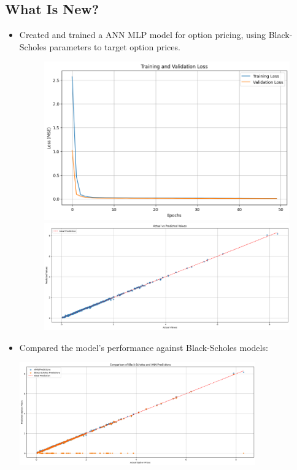 \documentclass[letterpaper,11pt]{article}
\begin{document}
\subsection*{What Is New?}
\begin{itemize}
    \item Created and trained a ANN MLP model for option pricing, using Black-Scholes parameters to target option prices.
            
\begin{figure}[H]
  \centering
  \begin{minipage}[b]{0.45\textwidth}
    \centering
    \includegraphics[width=\linewidth]{img/Loss_options_model.png} 
  \end{minipage}
  \hfill
  \begin{minipage}[b]{0.5\textwidth}
    \centering
    \includegraphics[width=\linewidth]{img/OPMreg.png}
  \end{minipage}
\end{figure}

    \item Compared the model's performance against Black-Scholes models:
            \begin{center}
            \includegraphics[width=0.8\textwidth]{img/BSvANN.png}
            \end{center}
            

\end{itemize}
\end{document}
